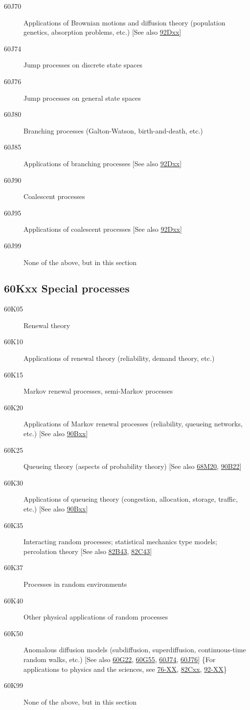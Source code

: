 \documentclass[letterpaper]{article}
\begin{document}
\begin{description}
\item [60J70]\label{60J70} Applications of Brownian motions and diffusion theory (population genetics, absorption problems, etc.) [See also \hyperref[92Dxx]{92Dxx}]
\item [60J74]\label{60J74} Jump processes on discrete state spaces
\item [60J76]\label{60J76} Jump processes on general state spaces
\item [60J80]\label{60J80} Branching processes (Galton-Watson, birth-and-death, etc.)
\item [60J85]\label{60J85} Applications of branching processes [See also \hyperref[92Dxx]{92Dxx}]
\item [60J90]\label{60J90} Coalescent processes
\item [60J95]\label{60J95} Applications of coalescent processes [See also \hyperref[92Dxx]{92Dxx}]
\item [60J99]\label{60J99} None of the above, but in this section
\end{description}
\subsection*{60Kxx  Special processes }\label{60Kxx}
\begin{description}  
\item [60K05]\label{60K05} Renewal theory
\item [60K10]\label{60K10} Applications of renewal theory (reliability, demand theory, etc.)
\item [60K15]\label{60K15} Markov renewal processes, semi-Markov processes
\item [60K20]\label{60K20} Applications of Markov renewal processes (reliability, queueing networks, etc.) [See also \hyperref[90Bxx]{90Bxx}]
\item [60K25]\label{60K25} Queueing theory (aspects of probability theory) [See also \hyperref[68M20]{68M20}, \hyperref[90B22]{90B22}]
\item [60K30]\label{60K30} Applications of queueing theory (congestion, allocation, storage, traffic, etc.) [See also \hyperref[90Bxx]{90Bxx}]
\item [60K35]\label{60K35} Interacting random processes; statistical mechanics type models; percolation theory [See also \hyperref[82B43]{82B43}, \hyperref[82C43]{82C43}]
\item [60K37]\label{60K37} Processes in random environments
\item [60K40]\label{60K40} Other physical applications of random processes
\item [60K50]\label{60K50} Anomalous diffusion models (subdiffusion, superdiffusion, continuous-time random walks, etc.) [See also \hyperref[60G22]{60G22}, \hyperref[60G55]{60G55}, \hyperref[60J74]{60J74}, \hyperref[60J76]{60J76}] \{For applications to physics and the sciences, see \hyperref[76-XX]{76-XX}, \hyperref[82Cxx]{82Cxx}, \hyperref[92-XX]{92-XX}\}
\item [60K99]\label{60K99} None of the above, but in this section
\end{description}
\end{document}
